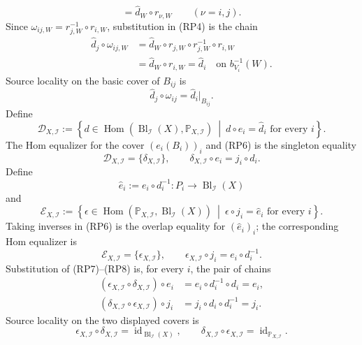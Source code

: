 \begin{definition}
\[      =\widehat d_W\circ r_{\nu,W}\qquad(\nu=i,j).              \tag{RP4}
  \]
  Since $\omega_{ij,W}=r_{j,W}^{-1}\circ r_{i,W}$, substitution in (RP4)
  is the chain
  \[
  \begin{aligned}
    \widehat d_j\circ\omega_{ij,W}
      &=\widehat d_W\circ r_{j,W}\circ
        r_{j,W}^{-1}\circ r_{i,W}\\
      &=\widehat d_W\circ r_{i,W}
       =\widehat d_i
       \quad\text{on }b_{V_i}^{-1}(W).
  \end{aligned}                                                \tag{RP5}
  \]
  Source locality on the basic cover of $B_{ij}$ is
  \[
    \widehat d_j\circ\omega_{ij}
      =\widehat d_i|_{B_{ij}}.                                 \tag{RP6}
  \]
  Define
  \[
    \mathscr D_{X,\mathcal I}:=
      \left\{d\in
        \operatorname{Hom}(\operatorname{Bl}_{\mathcal I}(X),
          \mathbb P_{X,\mathcal I})
        \ \middle|\ d\circ e_i=\widehat d_i\text{ for every }i\right\}.
  \]
  The Hom equalizer for the cover $(e_i(B_i))_i$ and (RP6) is the singleton
  equality
  \[
    \mathscr D_{X,\mathcal I}=\{\delta_{X,\mathcal I}\},\qquad
    \delta_{X,\mathcal I}\circ e_i=j_i\circ d_i.               \tag{RP7}
  \]
  Define
  \[
    \widehat e_i:=e_i\circ d_i^{-1}\colon
      P_i\longrightarrow\operatorname{Bl}_{\mathcal I}(X)
  \]
  and
  \[
    \mathscr E_{X,\mathcal I}:=
      \left\{\epsilon\in
        \operatorname{Hom}(\mathbb P_{X,\mathcal I},
          \operatorname{Bl}_{\mathcal I}(X))
        \ \middle|\ \epsilon\circ j_i=\widehat e_i
          \text{ for every }i\right\}.
  \]
  Taking inverses in (RP6) is the overlap equality for
  $(\widehat e_i)_i$; the corresponding Hom equalizer is
  \[
    \mathscr E_{X,\mathcal I}=\{\epsilon_{X,\mathcal I}\},\qquad
    \epsilon_{X,\mathcal I}\circ j_i=e_i\circ d_i^{-1}.        \tag{RP8}
  \]
  Substitution of (RP7)--(RP8) is, for every $i$, the pair of chains
  \[
  \begin{aligned}
    (\epsilon_{X,\mathcal I}\circ\delta_{X,\mathcal I})\circ e_i
      &=e_i\circ d_i^{-1}\circ d_i=e_i,\\
    (\delta_{X,\mathcal I}\circ\epsilon_{X,\mathcal I})\circ j_i
      &=j_i\circ d_i\circ d_i^{-1}=j_i.
  \end{aligned}
  \]
  Source locality on the two displayed covers is
  \[
    \epsilon_{X,\mathcal I}\circ\delta_{X,\mathcal I}
      =\operatorname{id}_{\operatorname{Bl}_{\mathcal I}(X)},\qquad
    \delta_{X,\mathcal I}\circ\epsilon_{X,\mathcal I}
      =\operatorname{id}_{\mathbb P_{X,\mathcal I}}.           \tag{RP9}
\]
\end{definition}
